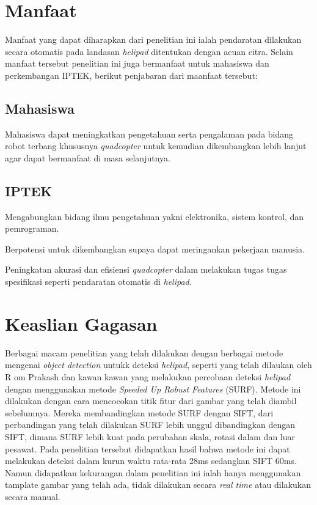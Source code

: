 \section{Manfaat}
Manfaat yang dapat diharapkan dari penelitian ini ialah pendaratan dilakukan secara otomatis pada landasan \textit{helipad} ditentukan dengan acuan citra. Selain manfaat tersebut penelitian ini juga bermanfaat untuk mahasiswa dan perkembangan IPTEK, berikut penjabaran dari maanfaat tersebut:

\subsection{Mahasiswa}
Mahasiswa dapat meningkatkan pengetahuan serta pengalaman pada bidang robot terbang khususnya \textit{quadcopter} untuk kemudian dikembangkan lebih lanjut agar dapat bermanfaat di masa selanjutnya.
\subsection{IPTEK}
\begin{packed_item}
	\item [a.]Mengabungkan bidang ilmu pengetahuan yakni elektronika, sistem kontrol, dan pemrograman.
	\item [b.]Berpotensi untuk dikembangkan supaya dapat meringankan pekerjaan manusia.
	\item [c.]Peningkatan akurasi dan efisiensi \textit{quadcopter} dalam melakukan tugas tugas spesifikasi seperti pendaratan otomatis di \textit{helipad}.
\end{packed_item}


\section{Keaslian Gagasan}
Berbagai macam penelitian yang telah dilakukan dengan berbagai metode mengenai \textit{object detection} untukk deteksi \textit{helipad}, seperti yang telah dilaukan oleh R om Prakash dan kawan kawan yang melakukan percobaan deteksi \textit{helipad} dengan menggunakan metode \textit{Speeded Up Robust Features} (SURF). Metode ini dilakukan dengan cara mencocokan titik fitur dari gambar yang telah diambil sebelumnya. Mereka membandingkan metode SURF dengan SIFT, dari perbandingan yang telah dilakukan SURF lebih unggul dibandingkan dengan SIFT, dimana SURF lebih kuat pada perubahan skala, rotasi dalam dan luar pesawat. Pada penelitian tersebut didapatkan hasil bahwa metode ini dapat melakukan deteksi dalam kurun waktu rata-rata 28ms sedangkan SIFT 60ms\cite{prakash2016autonomous}. Namun didapatkan kekurangan dalam penelitian ini ialah hanya menggunakan tamplate gambar yang telah ada, tidak dilakukan secara \textit{real time} atau dilakukan secara manual.

